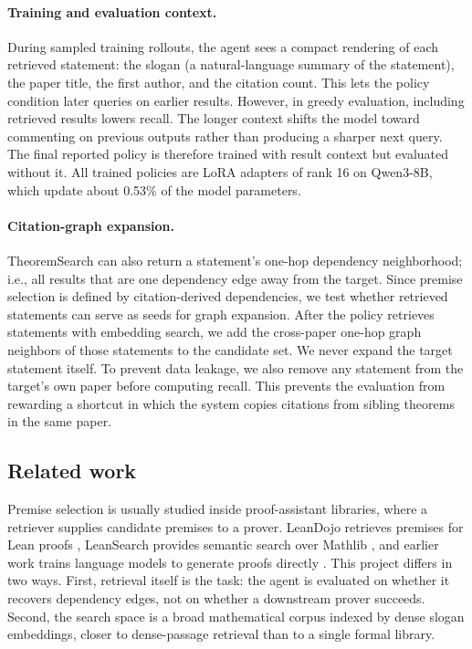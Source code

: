 \paragraph{Training and evaluation context.} During sampled training rollouts, the agent sees a compact rendering of each retrieved statement: the slogan (a natural-language summary of the statement), the paper title, the first author, and the citation count. This lets the policy condition later queries on earlier results. However, in greedy evaluation, including retrieved results lowers recall. The longer context shifts the model toward commenting on previous outputs rather than producing a sharper next query. The final reported policy is therefore trained with result context but evaluated without it. All trained policies are LoRA adapters of rank 16 on Qwen3-8B, which update about 0.53\% of the model parameters.

\paragraph{Citation-graph expansion.} TheoremSearch can also return a statement's one-hop dependency neighborhood; i.e., all results that are one dependency edge away from the target. Since premise selection is defined by citation-derived dependencies, we test whether retrieved statements can serve as seeds for graph expansion. After the policy retrieves statements with embedding search, we add the cross-paper one-hop graph neighbors of those statements to the candidate set. We never expand the target statement itself. To prevent data leakage, we also remove any statement from the target's own paper before computing recall. This prevents the evaluation from rewarding a shortcut in which the system copies citations from sibling theorems in the same paper.

\subsection{Related work}
Premise selection is usually studied inside proof-assistant libraries, where a retriever supplies candidate premises to a prover. LeanDojo retrieves premises for Lean proofs \cite{leandojo}, LeanSearch provides semantic search over Mathlib \cite{leansearch-v1, leansearch-v2}, and earlier work trains language models to generate proofs directly \cite{polu2020generative}. This project differs in two ways. First, retrieval itself is the task: the agent is evaluated on whether it recovers dependency edges, not on whether a downstream prover succeeds. Second, the search space is a broad mathematical corpus indexed by dense slogan embeddings, closer to dense-passage retrieval \cite{karpukhin2020dpr,zhang2025qwen3embedding} than to a single formal library.

